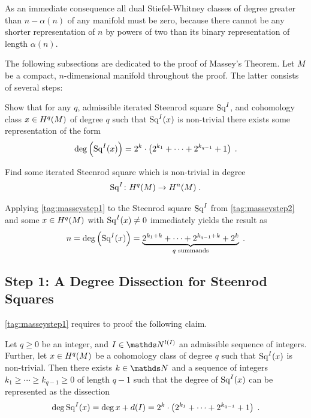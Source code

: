 As an immediate consequence all dual Stiefel-Whitney classes of degree
greater than $n-\alpha(n)$ of any manifold must be zero,
because there cannot be any shorter representation of $n$ by powers of
two than its binary representation of length $\alpha(n)$.

The following subsections are dedicated to the proof of Massey's Theorem.
Let $M$ be a compact, $n$-dimensional manifold throughout the proof.
The latter consists of several steps:
\begin{steps}
\item\label{tag:masseystep1} 
  Show that for any $q$, admissible iterated Steenrod square $\mathrm{Sq}^{I}$, and cohomology
  class $x\in H^q(M)$ of degree $q$ such that $\mathrm{Sq}^{I}(x)$ is non-trivial there exists
  some representation of the form
  \begin{gather*}
    \deg \left(\mathrm{Sq}^{I}(x)\right)
    = 2^k\cdot
    \left( 2^{k_1}+\dotsb+2^{k_{q-1}} + 1 \right)
    \;.
  \end{gather*}
\item\label{tag:masseystep2}
  Find some iterated Steenrod square which is non-trivial in degree
  \begin{gather*}
    \mathrm{Sq}^{I}\colon H^q(M)\to H^n(M)
    \;.
  \end{gather*}
\end{steps}
Applying \ref{tag:masseystep1} to the Steenrod square $\mathrm{Sq}^{I}$ from
\ref{tag:masseystep2} and some $x\in H^q(M)$ with $\mathrm{Sq}^{I}(x)\neq 0$
immediately yields the result as
\begin{gather*}
  n = \deg\left(\mathrm{Sq}^{I}(x)\right) = \underbrace
  {2^{k_1+k}+\dotsb+2^{k_{q-1}+k} + 2^{k}}_{\text{$q$ summands}}
  \;.
\end{gather*}

\subsection[Degree Dissection for Steenrod Squares]
{Step 1: A Degree Dissection for Steenrod Squares}
\ref{tag:masseystep1} requires to proof the following claim.
\begin{Lem}[\ref{tag:masseystep1}]\label{lem:masseystep1}
  Let $q\geq 0$ be an integer,
  and $I\in\Nat^{\l(I)}$ an admissible sequence of integers.
  Further, let $x\in H^q(M)$ be a cohomology class of degree $q$
  such that $\mathrm{Sq}^{I}(x)$ is non-trivial.
  Then there exists $k\in\Nat$ and a sequence of integers
  $k_1\geq\dotsb\geq k_{q-1}\geq0$ of length $q-1$ such that the
  degree of $\mathrm{Sq}^{I}(x)$ can be represented as the dissection
  \begin{gather*}
    \deg \mathrm{Sq}^{I}(x)
    = \deg x + d(I)
    = 2^k\cdot
    \left( 2^{k_1}+\dotsb+2^{k_{q-1}} + 1 \right)
    \;.
  \end{gather*}
\end{Lem}

